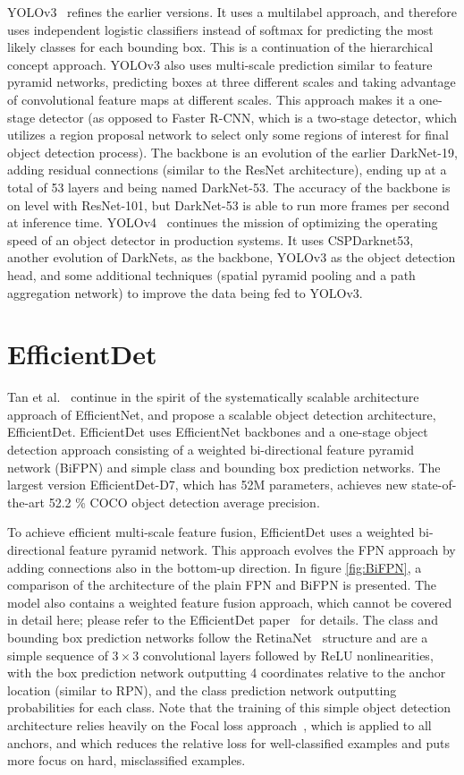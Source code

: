 \documentclass[english,twoside,openright]{HYgraduMLDS}
\begin{document}
YOLOv3~\cite{YOLOv3} refines the earlier versions. It uses a multilabel approach, and therefore uses independent logistic classifiers instead of softmax for predicting the most likely classes for each bounding box. This is a continuation of the hierarchical concept approach. YOLOv3 also uses multi-scale prediction similar to feature pyramid networks, predicting boxes at three different scales and taking advantage of convolutional feature maps at different scales. This approach makes it a one-stage detector (as opposed to Faster R-CNN, which is a two-stage detector, which utilizes a region proposal network to select only some regions of interest for final object detection process). The backbone is an evolution of the earlier DarkNet-19, adding residual connections (similar to the ResNet architecture), ending up at a total of 53 layers and being named DarkNet-53. The accuracy of the backbone is on level with ResNet-101, but DarkNet-53 is able to run more frames per second at inference time. YOLOv4~\cite{YOLOv4} continues the mission of optimizing the operating speed of an object detector in production systems. It uses CSPDarknet53, another evolution of DarkNets, as the backbone, YOLOv3 as the object detection head, and some additional techniques (spatial pyramid pooling and a path aggregation network) to improve the data being fed to YOLOv3.

\section{EfficientDet}
\label{section:EfficientDet}
Tan et al.~\cite{EfficientDet} continue in the spirit of the systematically scalable architecture approach of EfficientNet, and propose a scalable object detection architecture, EfficientDet. EfficientDet uses EfficientNet backbones and a one-stage object detection approach consisting of a weighted bi-directional feature pyramid network (BiFPN) and simple class and bounding box prediction networks. The largest version EfficientDet-D7, which has 52M parameters, achieves new state-of-the-art 52.2 \% COCO object detection average precision. 

To achieve efficient multi-scale feature fusion, EfficientDet uses a weighted bi-directional feature pyramid network. This approach evolves the FPN approach by adding connections also in the bottom-up direction. In figure \ref{fig:BiFPN}, a comparison of the architecture of the plain FPN and BiFPN is presented. The model also contains a weighted feature fusion approach, which cannot be covered in detail here; please refer to the EfficientDet paper~\cite{EfficientDet} for details. The class and bounding box prediction networks follow the RetinaNet~\cite{RetinaNet} structure and are a simple sequence of $3 \times 3$ convolutional layers followed by ReLU nonlinearities, with the box prediction network outputting 4 coordinates relative to the anchor location (similar to RPN), and the class prediction network outputting probabilities for each class. Note that the training of this simple object detection architecture relies heavily on the Focal loss approach~\cite{RetinaNet}, which is applied to all anchors, and which reduces the relative loss for well-classified examples and puts more focus on hard, misclassified examples.
\end{document}
